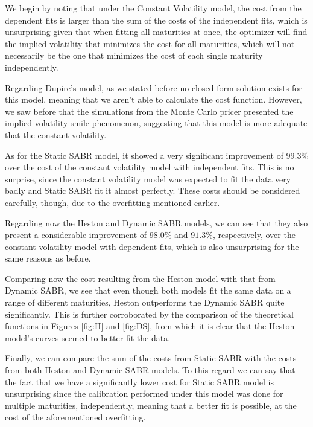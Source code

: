 We begin by noting that under the Constant Volatility model, the cost from the dependent fits is larger than the sum of the costs of the independent fits, which is unsurprising given that when fitting all maturities at once, the optimizer will find the implied volatility that minimizes the cost for all maturities, which will not necessarily be the one that minimizes the cost of each single maturity independently.

Regarding Dupire's model, as we stated before no closed form solution exists for this model, meaning that we aren't able to calculate the cost function. However, we saw before that the simulations from the Monte Carlo pricer presented the implied volatility smile phenomenon, suggesting that this model is more adequate that the constant volatility.

As for the Static SABR model, it showed a very significant improvement of $99.3\%$ over the cost of the constant volatility model with independent fits. This is no surprise, since the constant volatility model was expected to fit the data very badly and Static SABR fit it almost perfectly. These costs should be considered carefully, though, due to the overfitting mentioned earlier.


Regarding now the Heston and Dynamic SABR models, we can see that they also present a considerable improvement of $98.0\%$ and $91.3\%$, respectively, over the constant volatility model with dependent fits, which is also unsurprising for the same reasons as before.

Comparing now the cost resulting from the Heston model with that from Dynamic SABR, we see that even though both models fit the same data on a range of different maturities, Heston outperforms the Dynamic SABR quite significantly. This is further corroborated by the comparison of the theoretical functions in Figures \ref{fig:H} and \ref{fig:DS}, from which it is clear that the Heston model's curves seemed to better fit the data.



Finally, we can compare the sum of the costs from Static SABR with the costs from both Heston and Dynamic SABR models. To this regard we can say that the fact that we have a significantly lower cost for Static SABR model is unsurprising since the calibration performed under this model was done for multiple maturities, independently, meaning that a better fit is possible, at the cost of the aforementioned overfitting.

\vfill
\newpage

